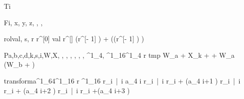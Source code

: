 \documentclass[12pt,a4paper]{book}
\begin{document}

\begin{eqcode}{T}{i}{}{}
   \lend
\end{eqcode}

\begin{eqcode}{F}{i, x, y, z}{, , , }{}
     \lend
     \lend
     \lend
     \lend
  \qendif
\end{eqcode}

\begin{eqcode}{rol}{val, s}{, }{}
  r \in {} \lend
  r^{[0]} \gets val \lend
  r^{[\iter]} \gets (r^{[\iter - 1]} ) +
  ((r^{[\iter - 1]} \land {}) ) \lend
   \lend
\end{eqcode}

\begin{eqcode}{P}{a,b,c,d,k,s,i,W,X}{, , ,
, , , , ^1_4,
^1_{16}}{^1_4}
    r \in {} \lend
    tmp \gets W_a + X_k +   +  \lend
    W_a \gets (W_b + ) \land {} \lend
     \lend
\end{eqcode}

\begin{eqcode}{transform}{a}{^1_{64}}{^1_{16}}
    r \in {}^1_{16} \lend
    r_i\  |\  \forall i \gets a_{4 \cdot i} \lend
    r_i\  |\  \forall i \gets r_i + (a_{4 \cdot i+1} ) \lend
    r_i\  |\  \forall i \gets r_i + (a_{4 \cdot i+2} ) \lend
    r_i\  |\  \forall i  \gets r_i +(a_{4 \cdot i+3} )\lend
     \lend
\end{eqcode}
\end{document}
